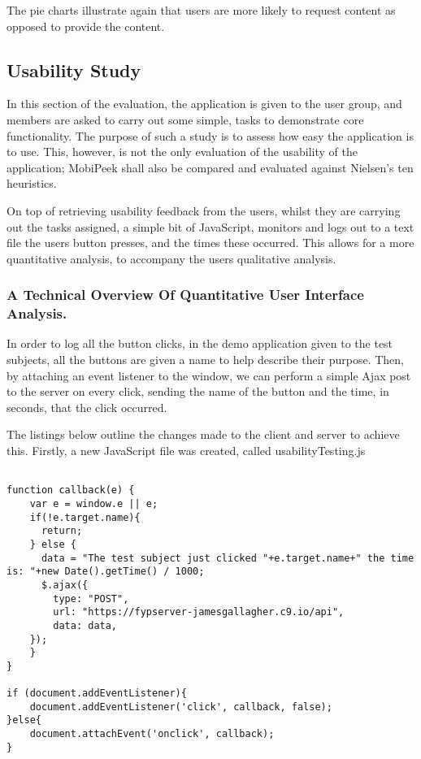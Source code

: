 \documentclass[a4paper]{article}
\begin{document}
The pie charts illustrate again that users are more likely to request content as opposed to provide the content.

\subsection{Usability Study}
In this section of the evaluation, the application is given to the user group, and members are asked to carry out some simple, tasks to demonstrate core functionality. The purpose of such a study is to assess how easy the application is to use. This, however, is not the only evaluation of the usability of the application; MobiPeek shall also be compared and evaluated against Nielsen's ten heuristics.

On top of retrieving usability feedback from the users, whilst they are carrying out the tasks assigned, a simple bit of JavaScript, monitors and logs out to a text file the users button presses, and the times these occurred. This allows for a more quantitative analysis, to accompany the users qualitative analysis.

\subsubsection{A Technical Overview Of Quantitative User Interface Analysis.}
In order to log all the button clicks, in the demo application given to the test subjects, all the buttons are given a name to help describe their purpose. Then, by attaching an event listener to the window, we can perform a simple Ajax post to the server on every click, sending the name of the button and the time, in seconds, that the click occurred.

The listings below outline the changes made to the client and server to achieve this. Firstly, a new JavaScript file was created, called usabilityTesting.js

\begin{lstlisting}[label=Usability testing script,caption=Usability testing script]

function callback(e) {
    var e = window.e || e;
    if(!e.target.name){
      return;
    } else {
      data = "The test subject just clicked "+e.target.name+" the time is: "+new Date().getTime() / 1000;
      $.ajax({
        type: "POST",
        url: "https://fypserver-jamesgallagher.c9.io/api",
        data: data,
    });
    }
}

if (document.addEventListener){
    document.addEventListener('click', callback, false);
}else{
    document.attachEvent('onclick', callback);
}
\end{lstlisting} 
\end{document}
